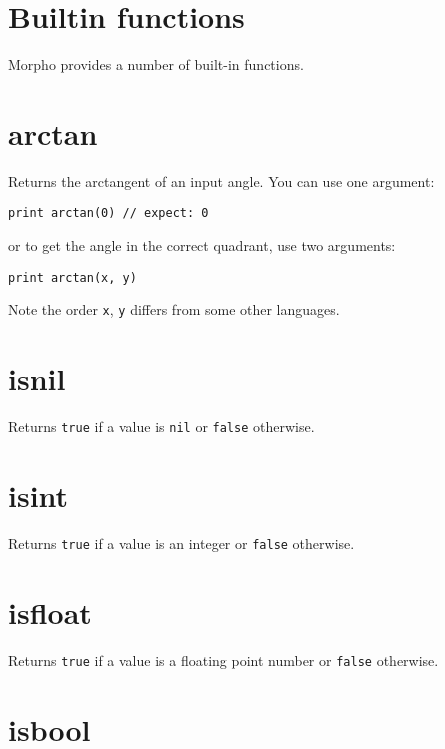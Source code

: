 \hypertarget{builtin-functions}{%
\section{Builtin functions}\label{builtin-functions}}

Morpho provides a number of built-in functions.

\hypertarget{arctan}{%
\section{arctan}\label{arctan}}

Returns the arctangent of an input angle. You can use one argument:

\begin{lstlisting}
print arctan(0) // expect: 0
\end{lstlisting}

or to get the angle in the correct quadrant, use two arguments:

\begin{lstlisting}
print arctan(x, y)
\end{lstlisting}

Note the order \texttt{x}, \texttt{y} differs from some other languages.

\hypertarget{isnil}{%
\section{isnil}\label{isnil}}

Returns \texttt{true} if a value is \texttt{nil} or \texttt{false}
otherwise.

\hypertarget{isint}{%
\section{isint}\label{isint}}

Returns \texttt{true} if a value is an integer or \texttt{false}
otherwise.

\hypertarget{isfloat}{%
\section{isfloat}\label{isfloat}}

Returns \texttt{true} if a value is a floating point number or
\texttt{false} otherwise.

\hypertarget{isbool}{%
\section{isbool}\label{isbool}}

